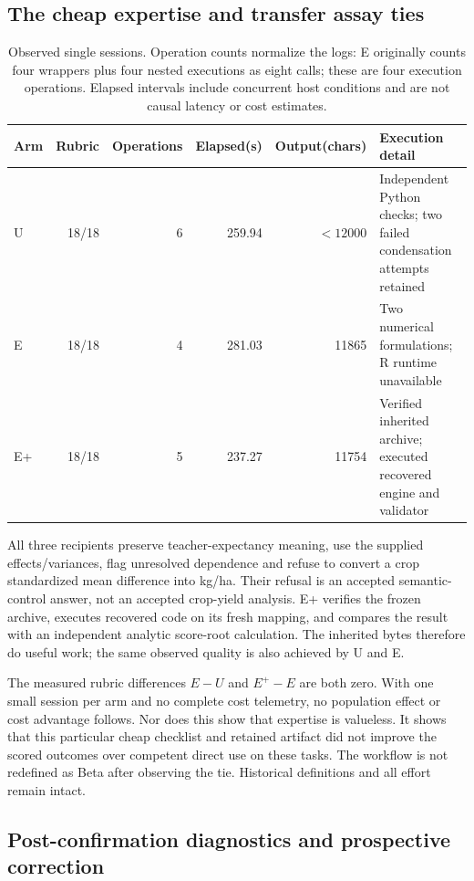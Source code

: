 \subsection{The cheap expertise and transfer assay ties}

\begin{table}[htbp]
\begin{tabularx}{\textwidth}{lrrrrY}
\toprule
Arm & Rubric & Operations & Elapsed(s) & Output(chars) & Execution detail\\
\midrule
U &18/18&6&259.94&$<12000$&Independent Python checks; two failed condensation attempts retained\\
E &18/18&4&281.03&11865&Two numerical formulations; R runtime unavailable\\
E+ &18/18&5&237.27&11754&Verified inherited archive; executed recovered engine and validator\\
\bottomrule
\end{tabularx}
\caption{Observed single sessions. Operation counts normalize the logs: E originally counts four wrappers plus four nested executions as eight calls; these are four execution operations. Elapsed intervals include concurrent host conditions and are not causal latency or cost estimates.}
\end{table}

All three recipients preserve teacher-expectancy meaning, use the supplied effects/variances, flag unresolved dependence and refuse to convert a crop standardized mean difference into kg/ha. Their refusal is an accepted semantic-control answer, not an accepted crop-yield analysis. E+ verifies the frozen archive, executes recovered code on its fresh mapping, and compares the result with an independent analytic score-root calculation. The inherited bytes therefore do useful work; the same observed quality is also achieved by U and E.

The measured rubric differences $E-U$ and $E^+-E$ are both zero. With one small session per arm and no complete cost telemetry, no population effect or cost advantage follows. Nor does this show that expertise is valueless. It shows that this particular cheap checklist and retained artifact did not improve the scored outcomes over competent direct use on these tasks. The workflow is not redefined as Beta after observing the tie. Historical definitions and all effort remain intact.

\subsection{Post-confirmation diagnostics and prospective correction}

